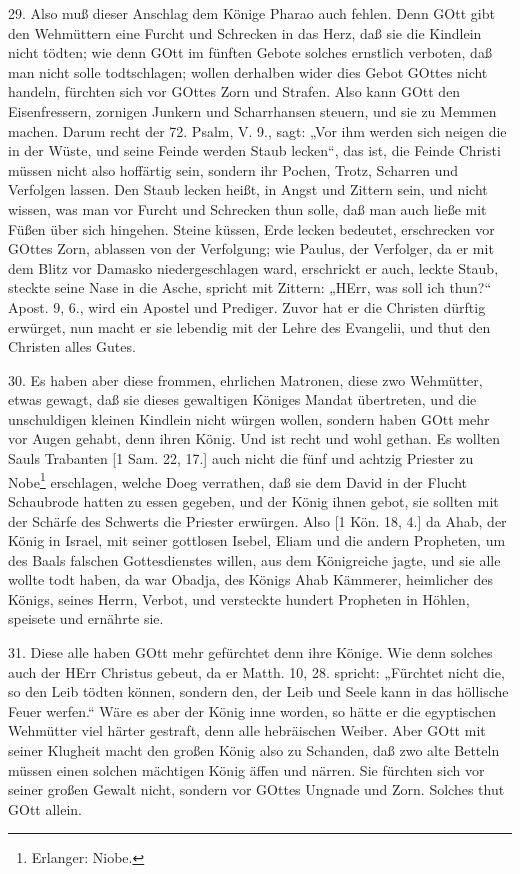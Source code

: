 29. Also muß dieser Anschlag dem Könige Pharao auch fehlen. Denn GOtt gibt den Wehmüttern eine Furcht und Schrecken in das Herz, daß sie die Kindlein nicht tödten; wie denn GOtt im fünften Gebote solches ernstlich verboten, daß man nicht solle todtschlagen; wollen derhalben wider dies Gebot GOttes nicht handeln, fürchten sich vor GOttes Zorn und Strafen. Also kann GOtt den Eisenfressern, zornigen Junkern und Scharrhansen steuern, und sie zu
Memmen machen. Darum recht der 72. Psalm, V. 9., sagt: „Vor ihm werden sich neigen die in der Wüste, und seine Feinde werden Staub lecken“, das ist, die Feinde Christi müssen nicht also hoffärtig sein, sondern ihr Pochen, Trotz, Scharren und Verfolgen lassen. Den Staub lecken heißt, in Angst und Zittern sein, und nicht wissen, was man vor Furcht und Schrecken thun solle, daß man auch ließe mit Füßen über sich hingehen. Steine küssen, Erde lecken bedeutet, erschrecken vor GOttes Zorn, ablassen von der Verfolgung; wie Paulus, der Verfolger, da er mit dem Blitz vor Damasko niedergeschlagen ward, erschrickt er auch, leckte Staub, steckte seine Nase in die Asche, spricht mit Zittern: „HErr, was soll ich thun?“ Apost. 9, 6., wird ein Apostel und Prediger. Zuvor hat er die Christen dürftig erwürget, nun macht er sie lebendig mit der Lehre des Evangelii, und thut den Christen alles Gutes.

30. Es haben aber diese frommen, ehrlichen Matronen, diese zwo Wehmütter, etwas gewagt, daß sie dieses gewaltigen Königes Mandat übertreten, und die unschuldigen kleinen Kindlein nicht würgen wollen, sondern haben GOtt mehr vor Augen gehabt, denn ihren König. Und ist recht und wohl gethan. Es wollten Sauls Trabanten [1 Sam. 22, 17.] auch nicht die fünf und achtzig Priester zu Nobe\footnote{Erlanger: Niobe.} erschlagen, welche Doeg verrathen, daß sie dem David in der Flucht Schaubrode hatten zu essen gegeben, und der König ihnen gebot, sie sollten mit der Schärfe des Schwerts die Priester erwürgen. Also [1 Kön. 18, 4.] da Ahab, der König in Israel, mit seiner gottlosen Isebel, Eliam und die andern Propheten, um des Baals falschen Gottesdienstes willen, aus dem Königreiche jagte, und sie alle wollte todt haben, da war Obadja, des Königs Ahab Kämmerer, heimlicher des Königs, seines Herrn, Verbot, und versteckte hundert Propheten in Höhlen, speisete und ernährte sie.

31. Diese alle haben GOtt mehr gefürchtet denn ihre Könige. Wie denn solches auch der HErr Christus gebeut, da er Matth. 10, 28. spricht: „Fürchtet nicht die, so den Leib tödten können, sondern den, der Leib und Seele kann in das höllische Feuer werfen.“ Wäre es aber der König inne worden, so hätte er die egyptischen Wehmütter viel härter gestraft, denn alle hebräischen Weiber. Aber GOtt mit seiner Klugheit macht den großen König also zu Schanden, daß zwo alte Betteln müssen einen solchen mächtigen König äffen und närren. Sie fürchten sich vor seiner großen Gewalt nicht, sondern vor GOttes Ungnade und Zorn. Solches thut GOtt allein.

